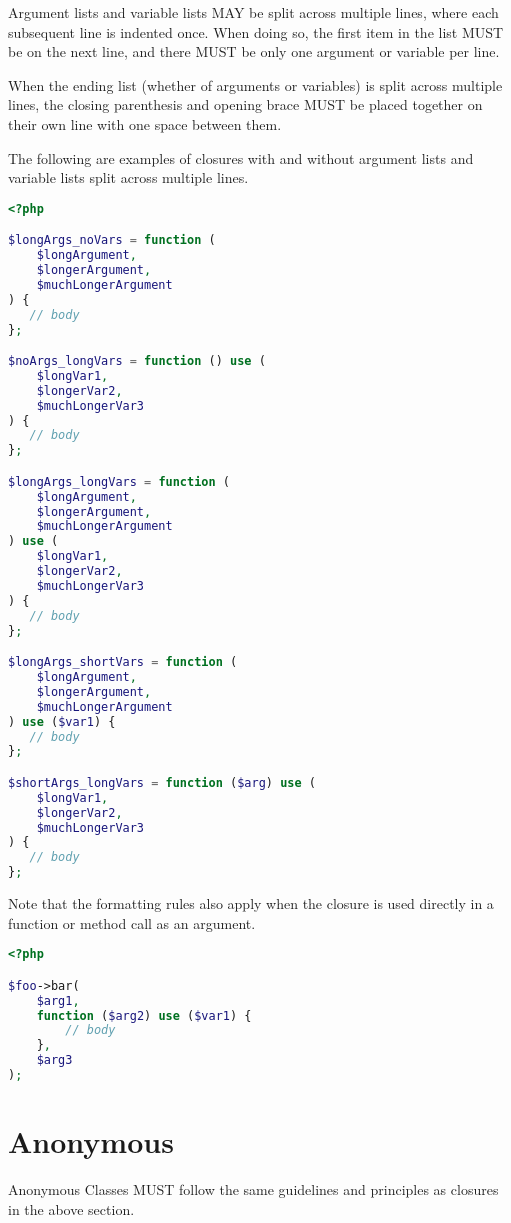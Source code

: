 Argument lists and variable lists MAY be split across multiple lines, where each subsequent line is indented once. When doing so, the first item in the list MUST be on the next line, and there MUST be only one argument or variable per line.

When the ending list (whether of arguments or variables) is split across multiple lines, the closing parenthesis and opening brace MUST be placed together on their own line with one space between them.

The following are examples of closures with and without argument lists and variable lists split across multiple lines.

\begin{lstlisting}[language=PHP]
<?php

$longArgs_noVars = function (
    $longArgument,
    $longerArgument,
    $muchLongerArgument
) {
   // body
};

$noArgs_longVars = function () use (
    $longVar1,
    $longerVar2,
    $muchLongerVar3
) {
   // body
};

$longArgs_longVars = function (
    $longArgument,
    $longerArgument,
    $muchLongerArgument
) use (
    $longVar1,
    $longerVar2,
    $muchLongerVar3
) {
   // body
};

$longArgs_shortVars = function (
    $longArgument,
    $longerArgument,
    $muchLongerArgument
) use ($var1) {
   // body
};

$shortArgs_longVars = function ($arg) use (
    $longVar1,
    $longerVar2,
    $muchLongerVar3
) {
   // body
};
\end{lstlisting}

Note that the formatting rules also apply when the closure is used directly in a function or method call as an argument.




\begin{lstlisting}[language=PHP]
<?php

$foo->bar(
    $arg1,
    function ($arg2) use ($var1) {
        // body
    },
    $arg3
);
\end{lstlisting}


\section{Anonymous}

Anonymous Classes MUST follow the same guidelines and principles as closures in the above section.




